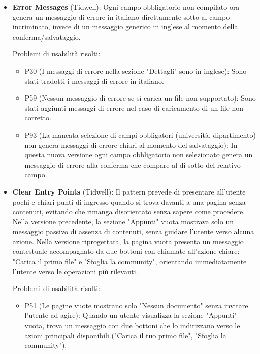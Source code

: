\begin{itemize}
  Problemi di usabilità risolti:
    \begin{itemize}
      \item P59 (Nessun messaggio di errore se si carica un file non supportato): Sono stati aggiunti messaggi che informano l'utente sui vincoli di caricamento accettati dal sistema.
    \end{itemize}

  \item \textbf{Error Messages} (Tidwell): Ogni campo obbligatorio non compilato ora genera un messaggio di errore in italiano direttamente sotto al campo incriminato, invece di un messaggio generico in inglese al momento della conferma/salvataggio.

  Problemi di usabilità risolti:
    \begin{itemize}
      \item P30 (I messaggi di errore nella sezione "Dettagli" sono in inglese): Sono stati tradotti i messaggi di errore in italiano.
      \item P59 (Nessun messaggio di errore se si carica un file non supportato): Sono stati aggiunti messaggi di errore nel caso di caricamento di un file non corretto.
      \item P93 (La mancata selezione di campi obbligatori (università, dipartimento) non genera messaggi di errore chiari al momento del salvataggio): In questa nuova versione ogni campo obbligatorio non selezionato genera un messaggio di errore alla conferma che compare al di sotto del relativo campo.
    \end{itemize} 

  \item \textbf{Clear Entry Points} (Tidwell): Il pattern prevede di presentare all'utente pochi e chiari punti di ingresso quando si trova davanti a una pagina senza contenuti, evitando che rimanga disorientato senza sapere come procedere. Nella versione precedente, la sezione "Appunti" vuota mostrava solo un messaggio passivo di assenza di contenuti, senza guidare l'utente verso alcuna azione. Nella versione riprogettata, la pagina vuota presenta un messaggio contestuale accompagnato da due bottoni con chiamate all'azione chiare: "Carica il primo file" e "Sfoglia la community", orientando immediatamente l'utente verso le operazioni più rilevanti.

  Problemi di usabilità risolti:
  \begin{itemize}
    \item P51 (Le pagine vuote mostrano solo "Nessun documento" senza invitare l'utente ad agire): Quando un utente visualizza la sezione "Appunti" vuota, trova un messaggio con due bottoni che lo indirizzano verso le azioni principali disponibili ("Carica il tuo primo file", "Sfoglia la community").
  \end{itemize}


\end{itemize}
